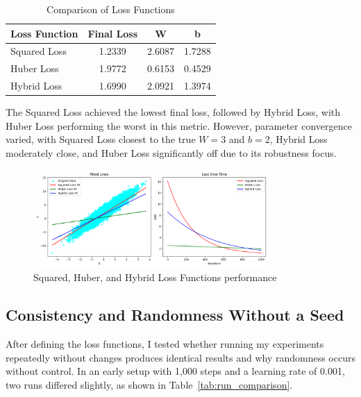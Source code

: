 \documentclass{article}
\begin{document}
\begin{table}[H]
    \centering
    \caption{Comparison of Loss Functions}
    \label{tab:loss_comparison}
    \begin{tabular}{lccc}
        \toprule
        \textbf{Loss Function} & \textbf{Final Loss} & \textbf{W} & \textbf{b} \\
        \midrule
        Squared Loss           & 1.2339             & 2.6087    & 1.7288    \\
        Huber Loss             & 1.9772             & 0.6153    & 0.4529    \\
        Hybrid Loss            & 1.6990             & 2.0921    & 1.3974    \\
        \bottomrule
    \end{tabular}
\end{table}

The Squared Loss achieved the lowest final loss, followed by Hybrid Loss, with Huber Loss performing the worst in this metric. However, parameter convergence varied, with Squared Loss closest to the true \( W = 3 \) and \( b = 2 \), Hybrid Loss moderately close, and Huber Loss significantly off due to its robustness focus.

\begin{figure}[H]
    \centering
    \includegraphics[width=0.8\textwidth]{assets/simple_results.png}
    \caption{Squared, Huber, and Hybrid Loss Functions performance}
    \label{fig:loss_curves}
\end{figure}

\subsection{Consistency and Randomness Without a Seed}

After defining the loss functions, I tested whether running my experiments repeatedly without changes produces identical results and why randomness occurs without control. In an early setup with 1,000 steps and a learning rate of 0.001, two runs differed slightly, as shown in Table~\ref{tab:run_comparison}.
\end{document}
